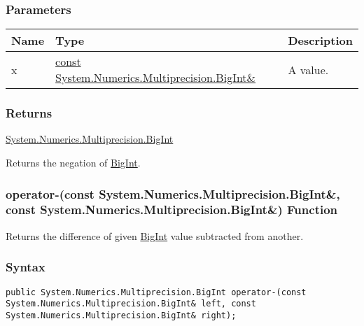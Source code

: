 \documentclass[a4paper,oneside,11.000000pt]{book}
\begin{document}
\subsubsection*{Parameters}
\begin{flushleft}
\begin{supertabular}[l]{!{\raggedright}p{1.30721cm}!{\raggedright}p{8.55945cm}!{\raggedright}p{2.65538cm}}
\textbf{Name}
& \textbf{Type}
& \textbf{Description}
\\
\hline
x
& \hyperlink{System.Numerics.Multiprecision.BigInt}{const System.\-Numerics.\-Multiprecision.\-BigInt\&\-}
& A value.

\\
\end{supertabular}

\end{flushleft}
\subsubsection*{Returns}
\hyperlink{System.Numerics.Multiprecision.BigInt}{System.\-Numerics.\-Multiprecision.\-BigInt}
\begin{flushleft}
Returns the negation of \hyperlink{System.Numerics.Multiprecision.BigInt}{BigInt}.

\end{flushleft}
\clearpage

\hypertarget{System.Numerics.Multiprecision.operator.minus.C.R.System.Numerics.Multiprecision.BigInt.C.R.System.Numerics.Multiprecision.BigInt}{\subsubsection*{operator-(const System.Numerics.Multiprecision.BigInt\&, const System.Numerics.Multiprecision.BigInt\&) Function}}
\begin{flushleft}
Returns the difference of given \hyperlink{System.Numerics.Multiprecision.BigInt}{BigInt} value subtracted from another.

\end{flushleft}
\subsubsection*{Syntax}
\texttt{public System.Numerics.Multiprecision.BigInt operator-(const System.Numerics.Multiprecision.BigInt\& left, const System.Numerics.Multiprecision.BigInt\& right);}
\end{document}
